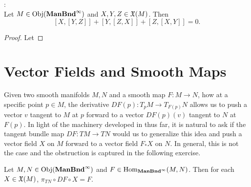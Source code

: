 \documentclass{book}
\begin{document}
\begin{ex} : \\
	Let $M \in \operatorname{Obj}(\operatorname*{\text{\textbf{ManBnd}}^{\infty}})$ and $X,Y, Z \in \mathfrak{X}(M)$. Then 
	$$[X, [Y, Z]] + [Y, [Z, X]] + [Z, [X, Y]] = 0.$$
\end{ex}

\begin{proof}
	Let 
\end{proof}
























































\newpage
\section{Vector Fields and Smooth Maps}

Given two smooth manifolds $M,N$ and a smooth map $F:M \rightarrow N$,  how at a specific point $p \in M$, the derivative $DF(p):T_pM \rightarrow T_{F(p)}N$ allows us to push a vector $v$ tangent to $M$ at $p$ forward to a vector $DF(p)(v)$ tangent to $N$ at $F(p)$. In light of the machinery developed in  thus far, it is natural to ask if the tangent bundle map $DF:TM \rightarrow TN$ would us to generalize this idea and push a vector field $X$ on $M$ forward to a vector field $F_*X$ on $N$. In general, this is not the case and the obstruction is captured in the following exercise.

\begin{ex}
	Let $M, N \in \operatorname{Obj}(\operatorname*{\text{\textbf{ManBnd}}^{\infty}})$ and $F \in \operatorname{Hom}_{\operatorname*{\text{\textbf{ManBnd}}^{\infty}}}(M, N)$. Then for each $X \in \mathfrak{X}(M)$, $\pi_{TN} \circ DF \circ X = F$.
\end{ex}
\end{document}
